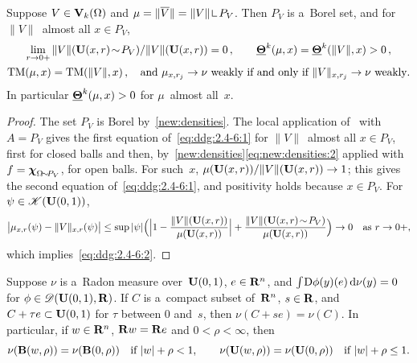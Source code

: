 \documentclass[a4paper,twoside,leqno]{article}
\DeclareMathOperator{\TM}{TM}                   %
\begin{document}
\begin{lemma}
    \label{ddg:2.4-6}
    Suppose $V \in \mathbf{V}_{k}(\Omega)$ and $\mu = \|\overline V\| = \|V\| \restrict P_V$. Then
    $P_V$ is a~Borel set, and for $\|V\|$~almost all $x \in P_V$,
    \begin{gather}
        \label{eq:ddg:2.4-6:1}
        \lim_{r \to 0+} \|V\|(\oball{x}{r} \without P_V) / \|V\|(\oball{x}{r}) = 0 \,, \qquad
        \ldensity^{\vdim}(\mu,x) = \ldensity^{\vdim}(\|V\|,x) > 0 \,, \\
        \label{eq:ddg:2.4-6:2}
        \TM(\mu,x) = \TM(\|V\|,x) \,, \quad \text{and $\mu_{x,r_j} \to \nu$ weakly if and only if
        $\|V\|_{x,r_j} \to \nu$ weakly}.
    \end{gather}
    In particular $\boldsymbol{\underline{\Theta}}^{k}(\mu,x) > 0$ for $\mu$~almost all~$x$.
\end{lemma}

\begin{proof}
    The set $P_V$ is Borel by~\ref{new:densities}. The local application
    of~\cite[2.8.18, 2.9.11]{Federer1969} with $A = P_V$ gives the first equation
    of~\eqref{eq:ddg:2.4-6:1} for $\|V\|$~almost all $x \in P_V$, first for closed balls and then,
    by~\ref{new:densities}\eqref{eq:new:densities:2} applied with $f = \boldsymbol{\chi}_{\Omega \!\sim\! P_V}$, for
    open balls. For such~$x$, $\mu(\mathbf{U}(x,r)) / \|V\|(\mathbf{U}(x,r)) \to 1$; this gives the second
    equation of~\eqref{eq:ddg:2.4-6:1}, and positivity holds because $x \in P_V$. For $\psi \in
    \mathscr{K}(\mathbf{U}(0,1))$,
    \begin{displaymath}
        \bigl| \mu_{x,r}(\psi) - \|V\|_{x,r}(\psi) \bigr| \le \sup|\psi| \Bigl( \Bigl| 1 -
        \frac{\|V\|(\mathbf{U}(x,r))}{\mu(\mathbf{U}(x,r))} \Bigr| + \frac{\|V\|(\mathbf{U}(x,r) \!\sim\!
        P_V)}{\mu(\mathbf{U}(x,r))} \Bigr) \to 0 \quad \text{as $r \to 0+$},
    \end{displaymath}
    which implies~\eqref{eq:ddg:2.4-6:2}.
\end{proof}

\begin{lemma}[new]
    \label{new:translation}
    Suppose $\nu$ is a~Radon measure over~$\mathbf{U}(0,1)$, $e \in \mathbf{R}^{n}$, and
    ${\textstyle\int_{}^{}} \mathrm{D} \phi(y)(e) \,\mathrm{d} \nu(y) = 0$ for $\phi \in \mathscr{D}(\mathbf{U}(0,1),\mathbf{R})$. If $C$
    is a~compact subset of~$\mathbf{R}^{n}$, $s \in \mathbf{R}$, and $C + \tau e \subset \mathbf{U}(0,1)$ for
    $\tau$ between $0$ and~$s$, then $\nu(C + se) = \nu(C)$. In particular, if $w \in \mathbf{R}^{n}$,
    $\mathbf{R} w = \mathbf{R} e$ and $0 < \rho < \infty$, then
    \begin{displaymath}
        \nu(\mathbf{B}(w,\rho)) = \nu(\mathbf{B}(0,\rho)) \quad \text{if $|w| + \rho < 1$}, \qquad
        \nu(\mathbf{U}(w,\rho)) = \nu(\mathbf{U}(0,\rho)) \quad \text{if $|w| + \rho \le 1$}.
    \end{displaymath}
\end{lemma}
\end{document}
